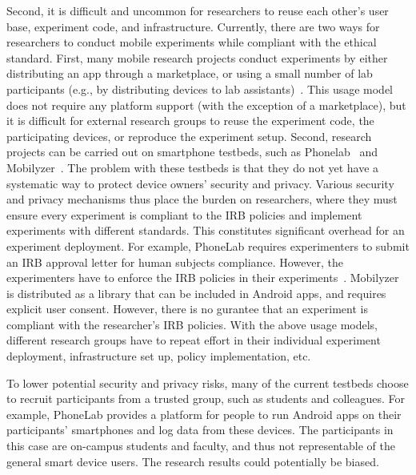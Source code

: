Second, it is difficult and uncommon for researchers to reuse each 
other's user base, experiment code, and infrastructure. 
Currently, there are two ways for researchers to conduct mobile 
experiments while compliant with the ethical standard. 
First, many mobile research projects conduct experiments 
by either distributing an app through a marketplace, or using a 
small number of lab participants (e.g., by distributing devices to 
lab assistants)~\cite{hao2013isleep, wang2012no, 
wang2013sensing}. This usage model does not require any 
platform support (with the exception of a marketplace), but it 
is difficult for external research groups to reuse the experiment 
code, the participating devices, or reproduce the experiment 
setup. Second, research projects can be carried out on 
smartphone testbeds, such as Phonelab~\cite{phonelab, 
nandugudi2013phonelab} and 
Mobilyzer~\cite{nikravesh2015mobilyzer}. 
The problem with these testbeds is that they do not  yet
have a systematic way to protect device owners' security and 
privacy. Various security and privacy mechanisms thus place 
the burden on researchers, where they must ensure every 
experiment is compliant to the IRB policies and implement 
experiments with different standards. This constitutes
significant overhead for an experiment deployment. For example, 
PhoneLab requires experimenters to 
submit an IRB approval letter for human subjects compliance. 
However, the experimenters have to enforce the IRB policies in their 
experiments~\cite{nandugudi2013phonelab}. 
Mobilyzer~\cite{nikravesh2015mobilyzer} is distributed 
as a library that can be included in Android apps, and requires 
explicit user consent. However, there is no gurantee that an 
experiment is compliant with the researcher's IRB policies.
With the above usage models, 
different research groups have to repeat effort in their individual 
experiment deployment, infrastructure set up, policy implementation, etc. 

To lower potential security and privacy risks, many of the current testbeds choose to 
recruit participants from a trusted group, such as students and 
colleagues. For example, PhoneLab provides a platform for 
people to run Android apps on their participants' smartphones 
and log data from these devices. %
The participants in this case are on-campus students and faculty, 
and thus not representable of the general smart device users. 
The research results could potentially 
be biased.
					
